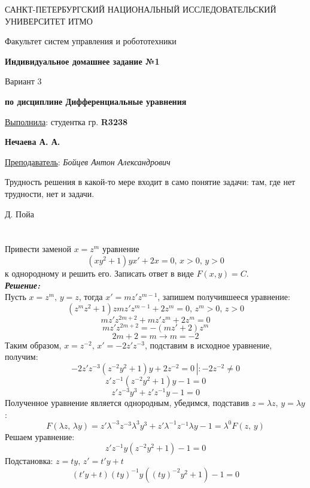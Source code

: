 \documentclass[a5paper, 10pt]{article}
\theoremstyle{definition}
\theoremstyle{plain}
\theoremstyle{remark}
\newcommand*{\titlePage}{
	\thispagestyle{title}
	\begingroup
	\begin{center}
		\vspace*{6ex}
		
		{\small
			САНКТ-ПЕТЕРБУРГСКИЙ НАЦИОНАЛЬНЫЙ ИССЛЕДОВАТЕЛЬСКИЙ УНИВЕРСИТЕТ ИТМО	
		}
		
		\vspace*{2ex}
		
		{\normalsize
			Факультет систем управления и робототехники
		}
		
		\vspace*{15ex}
		
		{\Large \bfseries 
			Индивидуальное домашнее задание №1
		}
\vspace*{3ex}
		
		{ \Large 
			Вариант 3
		}
\vspace*{3ex}
		
		{  \bfseries 
			по дисциплине Дифференциальные уравнения
		}
	\end{center}
	\vspace*{20ex}
	\begin{flushright}
		{\large 
			\underline{Выполнила}: студентка гр. \textbf{R3238}\\
			\begin{flushright}
				\textbf{Нечаева А. А.}\\
			\end{flushright}
		}
		
		\vspace*{5ex}
		
		{\large 
			\underline{Преподаватель}: \textit{Бойцев Антон Александрович}
		}
	\end{flushright}	
	\newpage
	\setcounter{page}{1}
	\endgroup}
\begin{document}
	\titlePage
	\pagestyle{style}
	
\newpage
\epigraph{Трудность решения в какой-то мере входит в само понятие задачи: там, где нет трудности, нет и задачи.}{Д. Пойа}

\section{}
Привести заменой $x=z^m$ уравнение 
\begin{equation*}
(xy^2+1)yx' + 2x = 0, \, x > 0, \, y > 0
\end{equation*}
к однородному и решить его. Записать ответ в виде $F(x, y) = C$.\\
\textit{\textbf{Решение:}}\\
Пусть $x=z^m, \, y = z$, тогда $x'=mz'z^{m-1}$, запишем получившееся уравнение:
\begin{equation*}
(z^mz^2+1)zmz'z^{m-1} + 2z^m = 0, \, z^m > 0, \, z > 0
\end{equation*}
\begin{equation*}
mz'z^{2m+2}+mz'z^{m} + 2z^m = 0
\end{equation*}
\begin{equation*}
mz'z^{2m+2}= -(mz' + 2)z^m
\end{equation*}
\begin{equation*}
2m+2 = m \to m = -2
\end{equation*}
Таким образом, $x = z^{-2}, \, x' = -2z' z^{-3}$, подставим в исходное уравнение, получим:
\begin{equation*}
-2z' z^{-3}( z^{-2}y^2+1)y + 2 z^{-2} = 0 \, \left| \right. : -2z^{-2} \neq 0
\end{equation*}
\begin{equation*}
z' z^{-1}( z^{-2}y^2+1)y -1 = 0 
\end{equation*}
\begin{equation*}
z' z^{-3}y^3+ z' z^{-1}y -1 = 0 
\end{equation*}
Полученное уравнение является однородным, убедимся, подставив $z = \lambda z, \, y = \lambda y$:
\begin{equation*}
 F( \lambda z,\, \lambda y ) = z' \lambda^{-3} z^{-3} \lambda^3y^3+ z' \lambda^{-1}z^{-1} \lambda y -1 =  \lambda^0  F(  z,\,  y )
\end{equation*}
Решаем уравнение:
\begin{equation*}
z'  z^{-1}y(z^{-2}y^2+ 1) -1 = 0 
\end{equation*}
Подстановка: $z = ty, \, z' = t'y + t$
\begin{equation*}
(t'y + t)  (ty)^{-1}y((ty)^{-2}y^2+ 1) -1 = 0 
\end{equation*}
\end{document}
